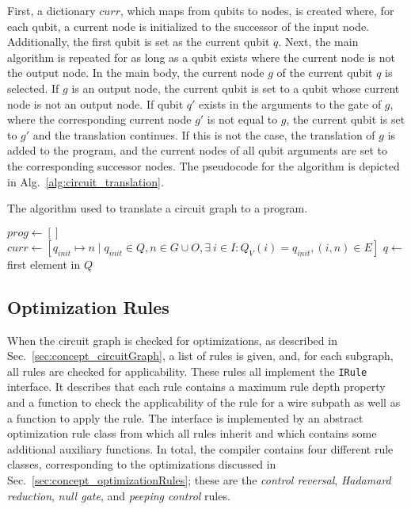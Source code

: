 First, a dictionary $curr$, which maps from qubits to nodes, is created where, for each qubit, a current node is initialized to the successor of the input node. Additionally, the first qubit is set as the current qubit $q$. Next, the main algorithm is repeated for as long as a qubit exists where the current node is not the output node. In the main body, the current node $g$ of the current qubit $q$ is selected. If $g$ is an output node, the current qubit is set to a qubit whose current node is not an output node. If qubit $q'$ exists in the arguments to the gate of $g$, where the corresponding current node $g'$ is not equal to $g$, the current qubit is set to $g'$ and the translation continues. If this is not the case, the translation of $g$ is added to the program, and the current nodes of all qubit arguments are set to the corresponding successor nodes. The pseudocode for the algorithm is depicted in Alg.~\ref{alg:circuit_translation}.

\begin{algorithm}
    \caption{The algorithm used to translate a circuit graph to a program.}
    \label{alg:circuit_translation}
    $prog \gets []$\;
    $curr \gets [q_{init} \mapsto n \mid q_{init} \in Q, n \in G \cup O, \exists \ i \in I : Q_V(i) = q_{init}, (i, n) \in E]$\;
    $q \gets$ first element in $Q$\; 
\end{algorithm}

\subsection{Optimization Rules}
When the circuit graph is checked for optimizations, as described in Sec.~\ref{sec:concept_circuitGraph}, a list of rules is given, and, for each subgraph, all rules are checked for applicability. These rules all implement the \texttt{IRule} interface. It describes that each rule contains a maximum rule depth property and a function to check the applicability of the rule for a wire subpath as well as a function to apply the rule. The interface is implemented by an abstract optimization rule class from which all rules inherit and which contains some additional auxiliary functions. In total, the compiler contains four different rule classes, corresponding to the optimizations discussed in Sec.~\ref{sec:concept_optimizationRules}; these are the \emph{control reversal}, \emph{Hadamard reduction}, \emph{null gate}, and \emph{peeping control} rules.

